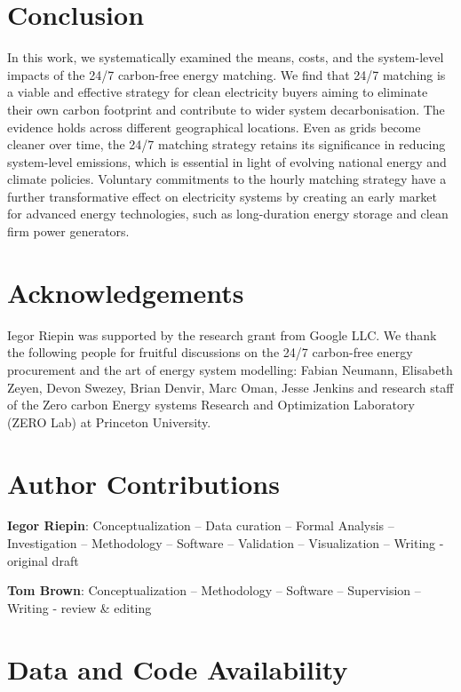 \documentclass[11pt, 5p, nopreprintline]{elsarticle}
\begin{document}
\section{Conclusion}
\label{sec:conclusion}

In this work, we systematically examined the means, costs, and the system-level impacts of the 24/7 carbon-free energy matching.
We find that 24/7 matching is a viable and effective strategy for clean electricity buyers aiming to eliminate their own carbon footprint and contribute to wider system decarbonisation.
The evidence holds across different geographical locations.
Even as grids become cleaner over time, the 24/7 matching strategy retains its significance in reducing system-level emissions, which is essential in light of evolving national energy and climate policies.
Voluntary commitments to the hourly matching strategy have a further transformative effect on electricity systems by creating an early market for advanced energy technologies, such as long-duration energy storage and clean firm power generators.

\section*{Acknowledgements}

Iegor Riepin was supported by the research grant from Google LLC. We thank the following people for fruitful discussions on the 24/7 carbon-free energy procurement and the art of energy system modelling: Fabian Neumann, Elisabeth Zeyen, Devon Swezey, Brian Denvir, Marc Oman, Jesse Jenkins and research staff of the Zero carbon Energy systems Research and Optimization Laboratory (ZERO Lab) at Princeton University.

\section*{Author Contributions}


\textbf{Iegor Riepin}:
Conceptualization --
Data curation --
Formal Analysis --
Investigation --
Methodology --
Software --
Validation --
Visualization --
Writing - original draft

\textbf{Tom Brown}:
Conceptualization --
Methodology --
Software --
Supervision --
Writing - review \& editing

\section*{Data and Code Availability}
\label{sec:code}
\end{document}
